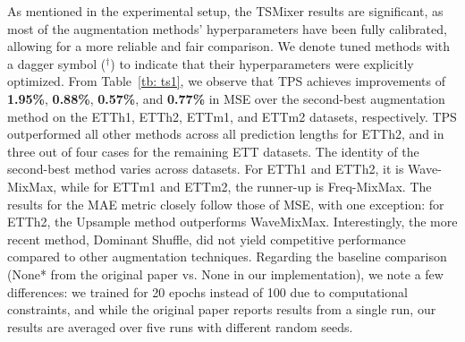 As mentioned in the experimental setup, the TSMixer results are significant, as most of the augmentation methods' hyperparameters have been fully calibrated, allowing for a more reliable and fair comparison. We denote tuned methods with a dagger symbol ($^{\dagger}$) to indicate that their hyperparameters were explicitly optimized. From Table~\ref{tb: ts1}, we observe that TPS achieves improvements of \textbf{1.95\%}, \textbf{0.88\%}, \textbf{0.57\%}, and \textbf{0.77\%} in MSE over the second-best augmentation method on the ETTh1, ETTh2, ETTm1, and ETTm2 datasets, respectively. TPS outperformed all other methods across all prediction lengths for ETTh2, and in three out of four cases for the remaining ETT datasets. The identity of the second-best method varies across datasets. For ETTh1 and ETTh2, it is Wave-MixMax, while for ETTm1 and ETTm2, the runner-up is Freq-MixMax. The results for the MAE metric closely follow those of MSE, with one exception: for ETTh2, the Upsample method outperforms WaveMixMax. Interestingly, the more recent method, Dominant Shuffle, did not yield competitive performance compared to other augmentation techniques. Regarding the baseline comparison (None* from the original paper vs. None in our implementation), we note a few differences: we trained for 20 epochs instead of 100 due to computational constraints, and while the original paper reports results from a single run, our results are averaged over five runs with different random seeds.


